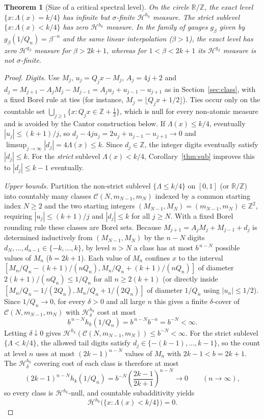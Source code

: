 \documentclass[11pt]{article}
\newtheorem{theorem}{Theorem}
\theoremstyle{definition}
\theoremstyle{remark}
\newcommand{\R}{\mathbb{R}}
\newcommand{\Z}{\mathbb{Z}}
\newcommand{\Lam}{\Lambda}
\begin{document}
\begin{theorem}[Size of a critical spectral level]\label{thm:gauge}
On the circle $\R/\Z$, the exact level $\{x:\Lam(x)=k/4\}$ has
infinite but $\sigma$-finite $\mathcal H^{h_k}$ measure.
The strict sublevel $\{x:\Lam(x)<k/4\}$ has zero $\mathcal H^{h_k}$ measure.
In the family of gauges $g_\beta$ given by $g_\beta(1/Q_n)=\beta^{-n}$
and the same linear interpolation ($\beta>1$), the exact level has zero
$\mathcal H^{g_\beta}$ measure for $\beta>2k+1$, whereas for $1<\beta<2k+1$ its
$\mathcal H^{g_\beta}$ measure is not $\sigma$-finite.
\end{theorem}

\begin{proof}
\emph{Digits.} Use $M_j$, $u_j=Q_jx-M_j$, $A_j=4j+2$ and
$d_j=M_{j+1}-A_jM_j-M_{j-1}=A_ju_j+u_{j-1}-u_{j+1}$ as in
Section~\ref{sec:class}, with a fixed Borel rule at ties (for instance,
$M_j=\lfloor Q_jx+1/2\rfloor$). Ties occur only on the
countable set $\bigcup_{j\ge1}\{x:Q_jx\in\Z+\tfrac12\}$, which is null for every
non-atomic measure and is avoided by the Cantor construction below.
If $\Lam(x)\le k/4$, eventually $|u_j|\le(k+1)/j$, so
$d_j-4ju_j=2u_j+u_{j-1}-u_{j+1}\to0$ and
$\limsup_{j\to\infty}|d_j|=4\Lam(x)\le k$. Since $d_j\in\Z$, the integer digits
eventually satisfy $|d_j|\le k$. For the \emph{strict} sublevel $\Lam(x)<k/4$,
Corollary~\ref{thm:sub} improves this to $|d_j|\le k-1$ eventually.

\emph{Upper bounds.} Partition the non-strict sublevel $\{\Lam\le k/4\}$ on
$[0,1]$ (or $\R/\Z$) into countably many classes
$\mathcal C(N,m_{N-1},m_N)$ indexed by a common starting index $N\ge2$ and the
two starting integers $(M_{N-1},M_N)=(m_{N-1},m_N)\in\Z^2$, requiring
$|u_j|\le(k+1)/j$ and $|d_j|\le k$ for all $j\ge N$. With a fixed Borel rounding
rule these classes are Borel sets. Because $M_{j+1}=A_jM_j+M_{j-1}+d_j$ is
determined inductively from $(M_{N-1},M_N)$ by the $n-N$ digits
$d_N,\dots,d_{n-1}\in\{-k,\dots,k\}$, by level $n>N$ a class has at most
$b^{\,n-N}$ possible values of $M_n$ ($b=2k+1$). Each value of $M_n$ confines
$x$ to the interval $[M_n/Q_n-(k+1)/(nQ_n),M_n/Q_n+(k+1)/(nQ_n)]$ of diameter
$2(k+1)/(nQ_n)\le1/Q_n$ for all $n\ge2(k+1)$ (or directly inside
$[M_n/Q_n-1/(2Q_n),M_n/Q_n+1/(2Q_n)]$ of diameter $1/Q_n$ using $|u_n|\le1/2$).
Since $1/Q_n\to0$, for every $\delta>0$ and all large $n$ this gives a finite
$\delta$-cover of $\mathcal C(N,m_{N-1},m_N)$ with $\mathcal H_\delta^{h_k}$
cost at most
\[
b^{\,n-N}h_k(1/Q_n)=b^{\,n-N}b^{-n}=b^{-N}<\infty.
\]
Letting $\delta\downarrow0$ gives
$\mathcal H^{h_k}(\mathcal C(N,m_{N-1},m_N))\le b^{-N}<\infty$. For the strict
sublevel $\{\Lam<k/4\}$, the allowed tail digits satisfy
$d_j\in\{-(k-1),\dots,k-1\}$, so the count at level $n$ uses at most
$(2k-1)^{n-N}$ values of $M_n$ with $2k-1<b=2k+1$. The $\mathcal H_\delta^{h_k}$
covering cost of each class is therefore at most
\[
(2k-1)^{n-N}h_k(1/Q_n)=b^{-N}\left(\frac{2k-1}{2k+1}\right)^{n-N}\longrightarrow0
\qquad(n\to\infty),
\]
so every class is $\mathcal H^{h_k}$-null, and countable subadditivity yields
\begin{equation}\label{eq:strict-null}
 \mathcal H^{h_k}\bigl(\{x:\Lam(x)<k/4\}\bigr)=0 .
\end{equation}


\end{proof}
\end{document}
